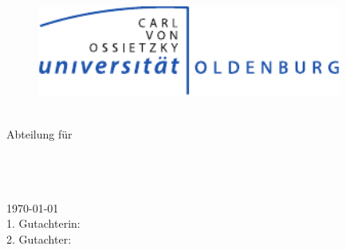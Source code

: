 \thispagestyle{empty}
\hoffset=0.4cm
\begin{center}
\begin{figure}
\centering
\includegraphics[width=10cm]{Abbildungen/uniol_4c}\\
\end{figure}
\vspace{2cm}
{\bf \Department}\\Abteilung für \Abteilung\\
\vspace{4cm}
{\bf \ArbeitTyp}\\
\vspace{.5cm}
{\begin{minipage}[t]{10cm}
\centering
\Large
\Titel
\end{minipage}}\\
\vspace{3cm}
\Name\\
\vspace{.5cm}
\today\\
\vspace{3cm}
1. Gutachterin: \ErstGutachter\\
2. Gutachter: \ZweitGutachter
\end{center}
